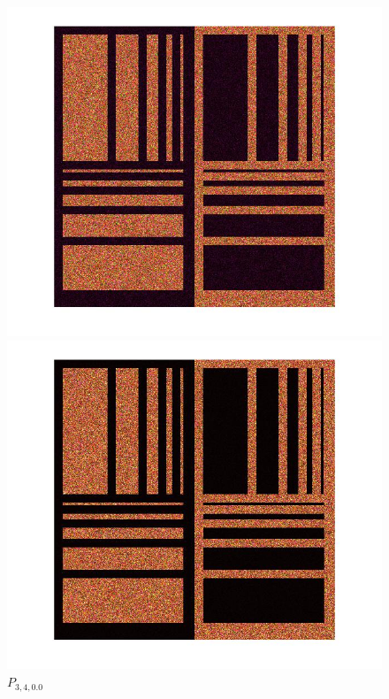 \documentclass[12pt,a4paper]{article}
\begin{document}
\begin{figure}[!htb]
  \includegraphics[width=\linewidth]{Eq_Phantom_0p000_2_5_1.jpg}
	\caption{ $P_{2,5,0.0}$}\label{fig:awesome_image1}
\endminipage
{}%
  \includegraphics[width=\linewidth]{Eq_Phantom_0p000_3_4_1.jpg}
	\caption{ $P_{3,4,0.0}$}\label{fig:awesome_image1}
\endminipage


\end{figure}
\end{document}
